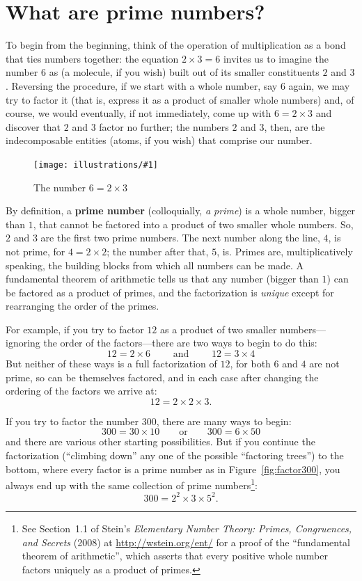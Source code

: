 \documentclass[openany]{book}
\newcommand{\ill}[3]{%
   \begin{figure}[H]%
   \vspace{-2ex}
   \centering%
   \texttt{[image: illustrations/\#1]}%
   \caption{#3}%
   \vspace{-2ex}
    \end{figure}}
\theoremstyle{plain}
\theoremstyle{definition}
\begin{document}
\chapter{What are prime numbers?}\label{ch:what_are_primes}

 To begin from the beginning, think
of the operation of multiplication as a bond that ties numbers
together: the equation $2\times 3= 6$ invites us to imagine the number
$6$ as (a molecule, if you wish) built out of its smaller constituents
$2$ and $3$.  Reversing the procedure, if we start with a whole
number, say $6$ again, we may try to factor it (that is, express it as
a product of smaller whole numbers) and, of course, we would
eventually, if not immediately, come up with $6 = 2\times 3$ and
discover that $2$ and $3$ factor no further; the numbers $2$ and $3$,
then, are the indecomposable entities (atoms, if you wish) that
comprise our number.

\ill{factor_tree_6}{.3}{The number $6 = 2\times 3$}


By definition, a {\bf prime number}
(colloquially, {\em a prime}) is a whole number, bigger than $1$, that
cannot be factored into a product of two smaller whole numbers. So,
$2$ and $3$ are the first two prime numbers. The next number along the
line, $4$, is not prime, for $4= 2\times 2$; the number after that,
$5$, is. Primes are, multiplicatively speaking, the building blocks
from which all numbers can be made. A fundamental theorem of
arithmetic tells us that any number (bigger than $1$) can be factored
as a product of primes, and the factorization is {\em unique} except
for rearranging the order of the primes.



For example, if you try to factor $12$ as a product of
two smaller numbers---ignoring the order of the factors---there are two
ways to begin to do this:
$$
  12 = 2 \times 6 \qquad\text{ and }\qquad   12 = 3 \times 4
$$
But neither of these ways is a full factorization of $12$, for both
$6$ and $4$ are not prime, so can be themselves factored, and in each
case after changing the ordering of the factors we arrive at:
$$
   12= 2 \times 2 \times 3.
$$

If you try to factor the number $300$, there are many
ways to begin:
$$
  300= 30\times 10\qquad\text{or}\qquad 300 = 6 \times 50
$$
and there are various other starting possibilities. But if you
continue the factorization (``climbing down'' any one of the possible
``factoring trees'') to the bottom, where every factor is a prime
number as in Figure~\ref{fig:factor300}, you always end up with the
same collection of prime numbers\footnote{See Section~1.1 of
Stein's {\em Elementary Number Theory: Primes, Congruences, and Secrets} (2008) at \url{http://wstein.org/ent/}
for a proof of the ``fundamental theorem of arithmetic'',
which asserts that every positive
whole number factors uniquely as a product of primes.}:
                 $$300 = 2^2\times 3\times 5^2.$$
\end{document}
